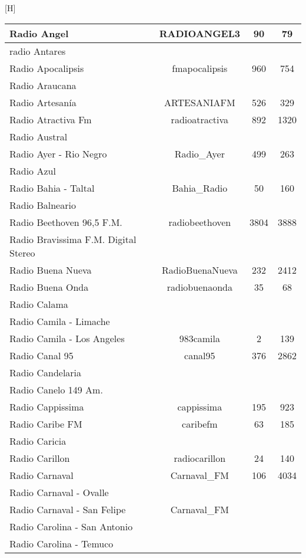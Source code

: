 \begin{center}[H]
\begin{longtable}{| l | c | c | c |}
Radio Angel	&	RADIOANGEL3	&	90	&	79	\\ \hline
radio Antares	&		&		&		\\ \hline
Radio Apocalipsis	&	fmapocalipsis	&	960	&	754	\\ \hline
Radio Araucana	&		&		&		\\ \hline
Radio Artesanía	&	ARTESANIAFM	&	526	&	329	\\ \hline
Radio Atractiva Fm	&	radioatractiva	&	892	&	1320	\\ \hline
Radio Austral	&		&		&		\\ \hline
Radio Ayer - Rio Negro	&	Radio\_Ayer	&	499	&	263	\\ \hline
Radio Azul	&		&		&		\\ \hline
Radio Bahia - Taltal	&	Bahia\_Radio	&	50	&	160	\\ \hline
Radio Balneario	&		&		&		\\ \hline
Radio Beethoven 96,5 F.M.	&	radiobeethoven	&	3804	&	3888	\\ \hline
Radio Bravissima F.M. Digital Stereo	&		&		&		\\ \hline
Radio Buena Nueva	&	RadioBuenaNueva	&	232	&	2412	\\ \hline
Radio Buena Onda	&	radiobuenaonda	&	35	&	68	\\ \hline
Radio Calama	&		&		&		\\ \hline
Radio Camila - Limache	&		&		&		\\ \hline
Radio Camila - Los Angeles	&	983camila	&	2	&	139	\\ \hline
Radio Canal 95	&	canal95	&	376	&	2862	\\ \hline
Radio Candelaria	&		&		&		\\ \hline
Radio Canelo 149 Am.	&		&		&		\\ \hline
Radio Cappissima	&	cappissima	&	195	&	923	\\ \hline
Radio Caribe FM	&	caribefm	&	63	&	185	\\ \hline
Radio Caricia	&		&		&		\\ \hline
Radio Carillon	&	radiocarillon	&	24	&	140	\\ \hline
Radio Carnaval	&	Carnaval\_FM	&	106	&	4034	\\ \hline
Radio Carnaval - Ovalle	&		&		&		\\ \hline
Radio Carnaval - San Felipe	&	Carnaval\_FM	&		&		\\ \hline
Radio Carolina - San Antonio	&		&		&		\\ \hline
Radio Carolina - Temuco	&		&		&		\\ \hline

\end{longtable}
\end{center}
